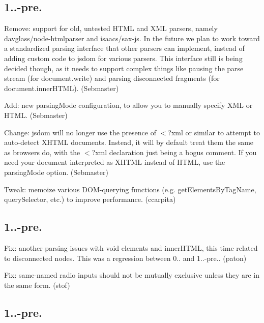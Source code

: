 \subsection*{1..-\/pre.}


\begin{DoxyItemize}
\item Remove\+: support for old, untested H\+T\+ML and X\+ML parsers, namely davglass/node-\/htmlparser and isaacs/sax-\/js. In the future we plan to work toward a standardized parsing interface that other parsers can implement, instead of adding custom code to jsdom for various parsers. This interface still is being decided though, as it needs to support complex things like pausing the parse stream (for {\ttfamily document.\+write}) and parsing disconnected fragments (for {\ttfamily document.\+inner\+H\+T\+ML}). (Sebmaster)
\item Add\+: new {\ttfamily parsing\+Mode} configuration, to allow you to manually specify X\+ML or H\+T\+ML. (Sebmaster)
\item Change\+: jsdom will no longer use the presence of {\ttfamily $<$?xml} or similar to attempt to auto-\/detect X\+H\+T\+ML documents. Instead, it will by default treat them the same as browsers do, with the {\ttfamily $<$?xml} declaration just being a bogus comment. If you need your document interpreted as X\+H\+T\+ML instead of H\+T\+ML, use the {\ttfamily parsing\+Mode} option. (Sebmaster)
\item Tweak\+: memoize various D\+O\+M-\/querying functions (e.\+g. {\ttfamily get\+Elements\+By\+Tag\+Name}, {\ttfamily query\+Selector}, etc.) to improve performance. (ccarpita)
\end{DoxyItemize}

\subsection*{1..-\/pre.}


\begin{DoxyItemize}
\item Fix\+: another parsing issues with void elements and {\ttfamily inner\+H\+T\+ML}, this time related to disconnected nodes. This was a regression between 0.. and 1..-\/pre.. (paton)
\item Fix\+: same-\/named radio inputs should not be mutually exclusive unless they are in the same form. (stof)
\end{DoxyItemize}

\subsection*{1..-\/pre.}


